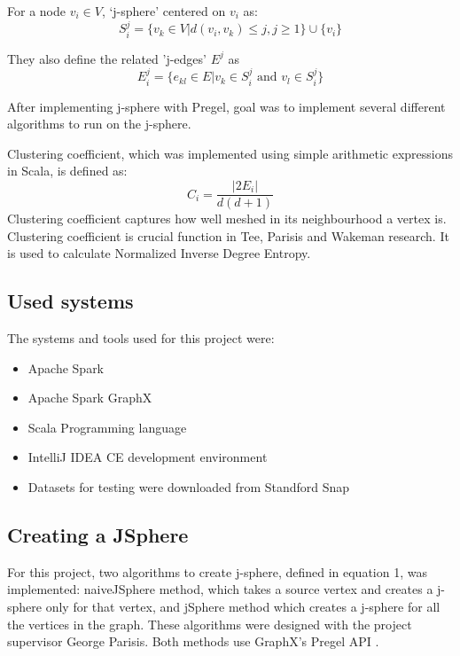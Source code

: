 \documentclass{article}
\theoremstyle{definition}
\begin{document}
For a node $v_{i} \in V$, `j-sphere'
  centered on $v_{i}$ as:
\begin{equation}\label{eqn:jsphere}
S^{j}_{i}= \{ v_{k} \in V | d(v_{i},v_{k}) \leq j, j \geq 1 \} \cup \{ v_{i} \}
\end{equation}

They also define the related 'j-edges' $E^{j}$ as
\begin{equation}
  E^{j}_{i}=\{ e_{kl} \in E | v_{k} \in S^{j}_{i} \mbox{ and  } v_{l} \in S^{j}_{i} \}
\end{equation}

After implementing j-sphere with Pregel, goal was to implement several different algorithms to run on the j-sphere. 

Clustering coefficient, which was implemented using simple arithmetic expressions in Scala, is defined as: 
\begin{equation}
C_{i} = \frac{|2E_{i}|}{d(d+1)}
\end{equation}
Clustering coefficient captures how well meshed in its neighbourhood a vertex is. Clustering coefficient is crucial function in Tee, Parisis and Wakeman research. It is used to calculate Normalized Inverse Degree Entropy. 


\subsection{Used systems}
The systems and tools used for this project were:
\begin{itemize}
\item Apache Spark
\item Apache Spark GraphX
\item Scala Programming language
\item IntelliJ IDEA CE development environment
\item Datasets for testing were downloaded from Standford Snap
\end{itemize}

\subsection{Creating a JSphere}

For this project, two algorithms to create j-sphere, defined in equation 1, was implemented: naiveJSphere method, which takes a source vertex and creates a j-sphere only for that vertex, and jSphere method which creates a j-sphere for all the vertices in the graph. These algorithms were designed with the project supervisor George Parisis. Both methods use GraphX's Pregel API \cite{GraphX}. \\
\end{document}
